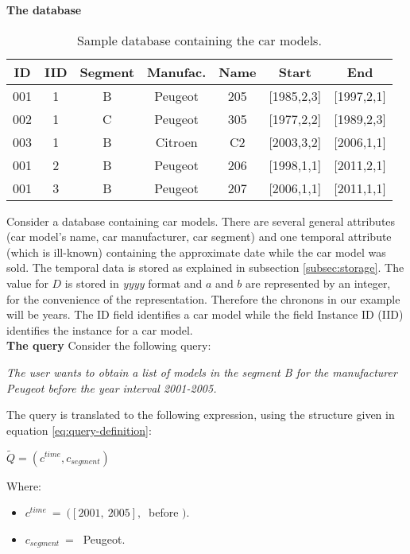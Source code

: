 \begin{example} 

\textbf{The database}
\begin{table}[ht]
\caption{Sample database containing the car models.}
\centering
\begin{tabular}{c c c c c c c}
\hline
ID & IID & Segment & Manufac. & Name & Start & End  \\ [0.5ex]
\hline
001 & 1 & B & Peugeot & 205 & [1985,2,3] & [1997,2,1] \\
002 & 1 & C & Peugeot & 305 & [1977,2,2] & [1989,2,3] \\
003 & 1 & B & Citroen & C2 & [2003,3,2] & [2006,1,1] \\
001 & 2 & B & Peugeot & 206 & [1998,1,1] & [2011,2,1] \\
001 & 3 & B & Peugeot & 207 & [2006,1,1] & [2011,1,1]\\
\hline
\end{tabular}
\label{tb:car-models}
\end{table}


Consider a database containing car models. There are several general attributes (car model's name, car manufacturer, car segment) and one temporal attribute (which is ill-known) containing the approximate date while the car model was sold. The temporal data is stored as explained in subsection \ref{subsec:storage}. The value for $D$ is stored in \emph{yyyy} format and $a$ and $b$ are represented by an integer, for the convenience of the representation. Therefore the chronons in our example will be years. The ID field identifies a car model while the field Instance ID (IID) identifies the instance for a car model. \\

\textbf{The query}
Consider the following query:

\emph{The user wants to obtain a list of models in the segment B for the manufacturer Peugeot before the year interval 2001-2005.}

The query is translated to the following expression, using the structure given in equation \eqref{eq:query-definition}:

\begin{center}
$\tilde{Q} = \left(  c^{time}, c_{segment} \right)$
\end{center}

Where:
\begin{itemize}
\item
$c^{time}\ = \ ( \left[ 2001,\ 2005 \right],\ $  before $)$.
\item
$c_{segment}\ = \ $ Peugeot.
\end{itemize}


\end{example}
